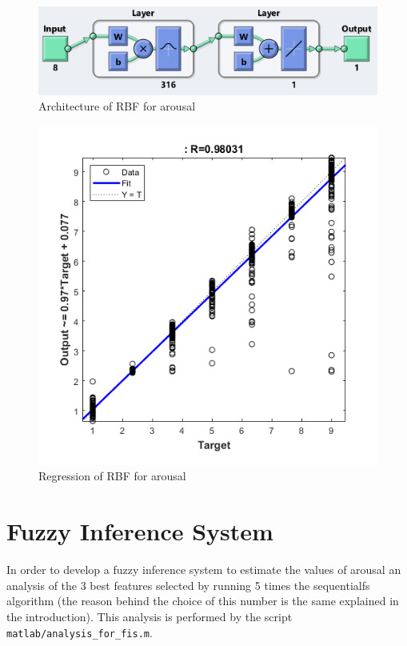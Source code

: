\documentclass[a4paper]{report}
\begin{document}
	
	\begin{figure}[htbp]
		\centering
		\includegraphics[scale=1]{img/rbf_arousal.png}
		\caption{Architecture of RBF for arousal}
		\label{img: rbf_arousal}
	\end{figure}

	\begin{figure}[htbp]
		\centering
		\includegraphics[scale=1]{img/regression_rbf_arousal.png}
		\caption{Regression of RBF for arousal}
		\label{img: regression_rbf_arousal}
	\end{figure}
	
\chapter{Fuzzy Inference System}
	\noindent In order to develop a fuzzy inference system to estimate the values of arousal an analysis of the 3 best features selected by running 5 times the sequentialfs algorithm (the reason behind the choice of this number is the same explained in the introduction). This analysis is performed by the script \texttt{matlab/analysis\_for\_fis.m}.
	
\end{document}
